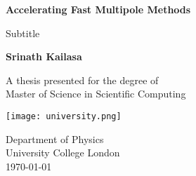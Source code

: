\begin{titlepage}
    \begin{center}
        \vspace*{1cm}
        
        \Huge
        \textbf{Accelerating Fast Multipole Methods}
        
        \Large
        \vspace{0.5cm}
        Subtitle
             
        \vfill
 
        \textbf{Srinath Kailasa}
 
        \vspace{5cm}
             
        A thesis presented for the degree of\\
        Master of Science in Scientific Computing
             
        \vspace{0.8cm}
      
        \texttt{[image: university.png]}
        
        \large
        Department of Physics\\
        University College London\\
        \today
             
    \end{center}
 \end{titlepage}